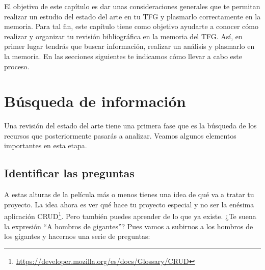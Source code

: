 El objetivo de este capítulo es dar unas consideraciones generales que te permitan realizar un estudio del estado del arte en tu TFG y plasmarlo correctamente en la memoria. Para tal fin, este capítulo tiene como objetivo ayudarte a conocer cómo realizar y organizar tu revisión bibliográfica en la memoria del TFG. Así, en primer lugar tendrás que buscar información, realizar un análisis y plasmarlo en la memoria. En las secciones siguientes te indicamos cómo llevar a cabo este proceso.

\section{Búsqueda de información}

Una revisión del estado del arte tiene una primera fase que es la búsqueda de los recursos que posteriormente pasarás a analizar. Veamos algunos elementos importantes en esta etapa.

\subsection{Identificar las preguntas}


A estas alturas de la película más o menos tienes una idea de qué va a tratar tu proyecto. La idea ahora es ver qué hace tu proyecto especial y no ser la enésima aplicación CRUD\footnote{\url{https://developer.mozilla.org/es/docs/Glossary/CRUD}}. Pero también puedes aprender de lo que ya existe. ¿Te suena la expresión ``A hombros de gigantes''? Pues vamos a subirnos a los hombros de los gigantes y hacernos una serie de preguntas:

